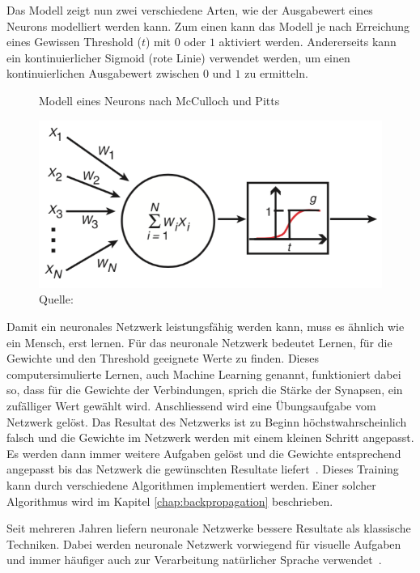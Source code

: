 Das Modell zeigt nun zwei verschiedene Arten, wie der Ausgabewert eines Neurons modelliert werden kann. Zum einen kann das Modell je nach Erreichung eines Gewissen Threshold ($t$) mit $0$ oder $1$ aktiviert werden. Andererseits kann ein kontinuierlicher Sigmoid (rote Linie) verwendet werden, um einen kontinuierlichen Ausgabewert zwischen $0$ und $1$ zu ermitteln.

\begin{figure}[h!]
    \captionsetup{width=.9\linewidth}
    \caption{Modell eines Neurons nach McCulloch und Pitts}
    \label{krogh:a}
    \centering
    \includegraphics[width=0.5\linewidth]{graphics/krogh/krogh_neural-network.png}
    \caption*{Quelle: \textcite{Krogh2008}}
\end{figure}

Damit ein neuronales Netzwerk leistungsfähig werden kann, muss es ähnlich wie ein Mensch, erst lernen. Für das neuronale Netzwerk bedeutet Lernen, für die Gewichte und den Threshold geeignete Werte zu finden. Dieses computersimulierte Lernen, auch Machine Learning genannt, funktioniert dabei so, dass für die Gewichte der Verbindungen, sprich die Stärke der Synapsen, ein zufälliger Wert gewählt wird. Anschliessend wird eine Übungsaufgabe vom Netzwerk gelöst. Das Resultat des Netzwerks ist zu Beginn höchstwahrscheinlich falsch und die Gewichte im Netzwerk werden mit einem kleinen Schritt angepasst. Es werden dann immer weitere Aufgaben gelöst und die Gewichte entsprechend angepasst bis das Netzwerk die gewünschten Resultate liefert~\autocite{Krogh2008}.
Dieses Training kann durch verschiedene Algorithmen implementiert werden. Einer solcher Algorithmus wird im Kapitel \ref{chap:backpropagation} beschrieben.

Seit mehreren Jahren liefern neuronale Netzwerke bessere Resultate als klassische Techniken. Dabei werden neuronale Netzwerk vorwiegend für visuelle Aufgaben und immer häufiger auch zur Verarbeitung natürlicher Sprache verwendet~\autocite{Olah2014b}.

